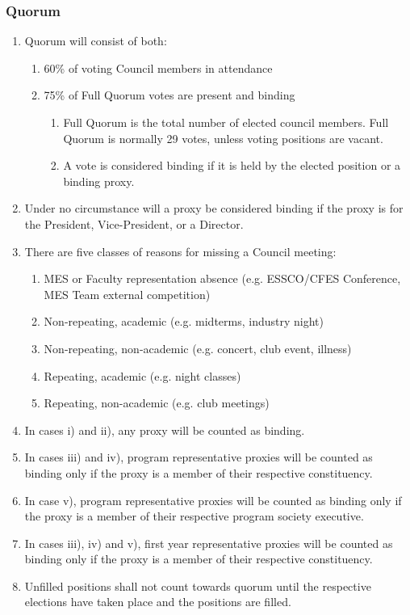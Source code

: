 \subsubsection{Quorum}
\label{quorum}

\begin{enumerate}
 \item
  Quorum will consist of both:

  \begin{enumerate}
   \item
    60\% of voting Council members in attendance
   \item
    75\% of Full Quorum votes are present and binding

    \begin{enumerate}
     \item
      Full Quorum is the total number of elected council members. Full Quorum is normally 29 votes, unless voting positions are vacant.
     \item
      A vote is considered binding if it is held by the elected position or a binding proxy.
    \end{enumerate}
  \end{enumerate}
 \item
  Under no circumstance will a proxy be considered binding if the proxy is for the President, Vice-President, or a Director.
 \item
  There are five classes of reasons for missing a Council meeting:

  \begin{enumerate}
   \item
    MES or Faculty representation absence (e.g. ESSCO/CFES Conference, MES Team external competition)
   \item
    Non-repeating, academic (e.g. midterms, industry night)
   \item
    Non-repeating, non-academic (e.g. concert, club event, illness)
   \item
    Repeating, academic (e.g. night classes)
   \item
    Repeating, non-academic (e.g. club meetings)
  \end{enumerate}
 \item
  In cases i) and ii), any proxy will be counted as binding.
 \item
  In cases iii) and iv), program representative proxies will be counted as binding only if the proxy is a member of their respective constituency.
 \item
  In case v), program representative proxies will be counted as binding only if the proxy is a member of their respective program society executive.
 \item
  In cases iii), iv) and v), first year representative proxies will be counted as binding only if the proxy is a member of their respective constituency.
 \item
  Unfilled positions shall not count towards quorum until the respective elections have taken place and the positions are filled.

\end{enumerate}


